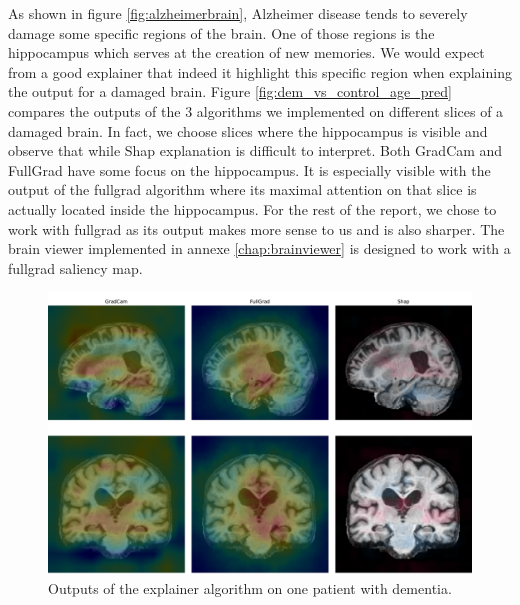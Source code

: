 As shown in figure \ref{fig:alzheimerbrain}, Alzheimer disease tends to severely damage some specific regions of the brain. One of those regions is the hippocampus which serves at the creation of new memories. We would expect from a good explainer that indeed it highlight this specific region when explaining the output for a damaged brain. Figure \ref{fig:dem_vs_control_age_pred} compares the outputs of the 3 algorithms we implemented on different slices of a damaged brain. In fact, we choose slices where the hippocampus is visible and observe that while Shap explanation is difficult to interpret. Both GradCam and FullGrad have some focus on the hippocampus. It is especially visible with the output of the fullgrad algorithm where its maximal attention on that slice is actually located inside the hippocampus. For the rest of the report, we chose to work with fullgrad as its output makes more sense to us and is also sharper. The brain viewer implemented in annexe \ref{chap:brainviewer} is designed to work with a fullgrad saliency map. 


\begin{figure}
    \centering
    \includegraphics[width=1\linewidth]{figures/Experiements/explainer_coparaison.pdf}
    \caption{Outputs of the explainer algorithm on one patient with dementia.}
    \label{fig:explainer_compared}
\end{figure}